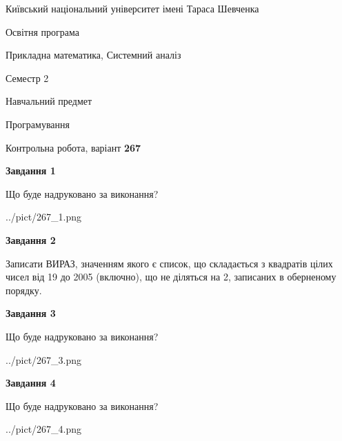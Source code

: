 \documentclass[12pt, ukrainian]{article}
\begin{document}
{{\begin {small}\par
{ \center  Київський національний університет імені Тараса Шевченка \par}
{\parbox {5 cm}{Освітня програма \hfill}{\parbox {8 cm}{Прикладна математика, Системний аналіз \hfill}}\parbox {5 cm}{\hfill Семестр 2}}\par
{\parbox {5 cm} {Навчальний предмет \hfill}\parbox {7 cm}{Програмування \hfill}\parbox {6cm}{\hfill}\par}\vspace{-7pt} \end{small}}{\center Контрольна робота, варіант  \No \textbf
{ 267 }\par}}
{
\begin {large}
{\begin {center}\textbf{Завдання 1}\end {center}}\par
Що буде надруковано за виконання?\par\par
\begin{center}
	{../pict/267_1.png}
\end{center}
\newpage

{\begin {center}\textbf{Завдання 2}\end {center}}\par

Записати ВИРАЗ, значенням якого є список, що складається з квадратів цілих чисел від 19 до 2005 (включно), що не діляться на 2, записаних в обернено\-му порядку.\par
\newpage

{\begin {center}\textbf{Завдання 3}\end {center}}\par
Що буде надруковано за виконання?
\begin{center}
	{../pict/267_3.png}
\end{center}
\newpage

{\begin {center}\textbf{Завдання 4}\end {center}}\par
Що буде надруковано за виконання?\par
\begin{center}
	{../pict/267_4.png}
\end{center}
\newpage


\end{large}}
\end{document}
